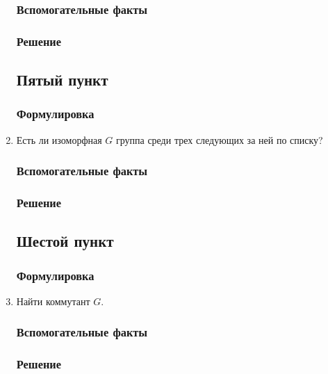 \documentclass[11pt, fleqn]{article}
\begin{document}
\begin{enumerate}
      \subsubsection{Вспомогательные факты}
      \subsubsection{Решение}
      \subsection{Пятый пункт}
      \subsubsection{Формулировка}
      \item Есть ли изоморфная $G$ группа среди трех следующих за ней по списку?
      \subsubsection{Вспомогательные факты}
      \subsubsection{Решение}
      \subsection{Шестой пункт}
      \subsubsection{Формулировка}
      \item Найти коммутант $G$.
      \subsubsection{Вспомогательные факты}
      \subsubsection{Решение}
    \end{enumerate}
\end{document}
